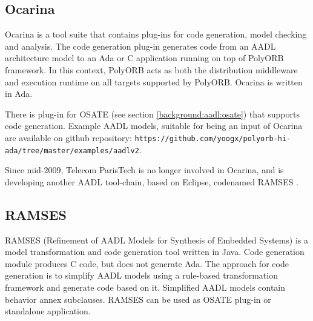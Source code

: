 \subsection{Ocarina}
\label{background:codegen:ocarina}

Ocarina \cite{Ocarina:Paper} is a tool suite that contains plug-ins for code generation, model checking and analysis. The code generation plug-in generates code from an AADL architecture model to an Ada or C application running on top of PolyORB framework. In this context, PolyORB acts as both the distribution middleware and execution runtime on all targets supported by PolyORB. Ocarina is written in Ada.

There is plug-in for OSATE (see section \ref{background:aadl:osate}) that supports code generation. Example AADL models, suitable for being an input of Ocarina are available on github repository: \lstinline{https://github.com/yoogx/polyorb-hi-ada/tree/master/examples/aadlv2}.

Since mid-2009, Telecom ParisTech is no longer involved in Ocarina, and is developing another AADL tool-chain, based on Eclipse, codenamed RAMSES \cite{RAMSES:Paper}.



\subsection{RAMSES}
\label{background:codegen:ramses}

RAMSES (Refinement of AADL Models for Synthesis of Embedded Systems) \cite{RAMSES:Paper} is a model transformation and code generation tool written in Java. Code generation module produces C code, but does not generate Ada. The approach for code generation is to simplify AADL models using a rule-based transformation framework and generate code based on it. Simplified AADL models contain behavior annex subclauses. RAMSES can be used as OSATE plug-in or standalone application.

